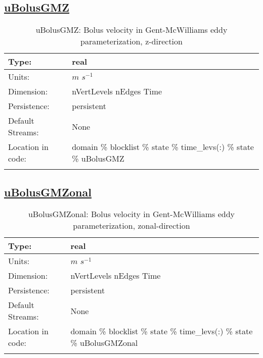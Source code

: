 \subsection[uBolusGMZ]{\hyperref[sec:var_tab_state]{uBolusGMZ}}
\label{subsec:var_sec_state_uBolusGMZ}
\begin{center}
\begin{longtable}{| p{2.0in} | p{4.0in} |}
        \hline 
        Type: & real \\
        \hline 
        Units: & $m$ $s^{-1}$ \\
        \hline 
        Dimension: & nVertLevels nEdges Time \\
        \hline 
        Persistence: & persistent \\
        \hline 
		 Default Streams: & None \\
        \hline 
		 Location in code: & domain \% blocklist \% state \% time\_levs(:) \% state \% uBolusGMZ \\
		 \hline 
    \caption{uBolusGMZ: Bolus velocity in Gent-McWilliams eddy parameterization, z-direction}
\end{longtable}
\end{center}
\subsection[uBolusGMZonal]{\hyperref[sec:var_tab_state]{uBolusGMZonal}}
\label{subsec:var_sec_state_uBolusGMZonal}
\begin{center}
\begin{longtable}{| p{2.0in} | p{4.0in} |}
        \hline 
        Type: & real \\
        \hline 
        Units: & $m$ $s^{-1}$ \\
        \hline 
        Dimension: & nVertLevels nEdges Time \\
        \hline 
        Persistence: & persistent \\
        \hline 
		 Default Streams: & None \\
        \hline 
		 Location in code: & domain \% blocklist \% state \% time\_levs(:) \% state \% uBolusGMZonal \\
		 \hline 
    \caption{uBolusGMZonal: Bolus velocity in Gent-McWilliams eddy parameterization, zonal-direction}
\end{longtable}
\end{center}
